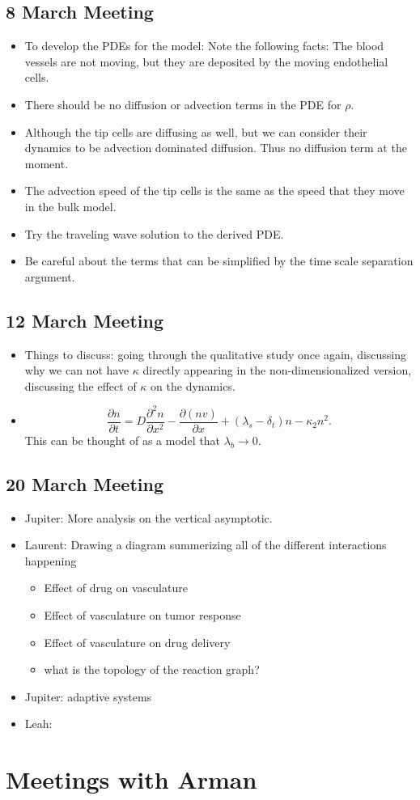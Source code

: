 \subsection{8 March Meeting}
\begin{itemize}
	\item To develop the PDEs for the model: Note the following facts: The blood vessels are not moving, but they are deposited by the moving endothelial cells.
	\item There should be no diffusion or advection terms in the PDE for $ \rho $.
	\item Although the tip cells are diffusing as well, but we can consider their dynamics to be advection dominated diffusion. Thus no diffusion term at the moment.
	\item The advection speed of the tip cells is the same as the speed that they move in the bulk model.
	\item Try the traveling wave solution to the derived PDE.
	\item Be careful about the terms that can be simplified by the time scale separation argument. 
\end{itemize}

\subsection{12 March Meeting}
\begin{itemize}
	\item Things to discuss: going through the qualitative study once again, discussing why we can not have $ \kappa $ directly appearing in the non-dimensionalized version, discussing the effect of $ \kappa $ on the dynamics.
	
	\item 
	\[ \frac{\partial n}{\partial t} = D \frac{\partial^2 n}{\partial x^2} - \frac{\partial(nv)}{\partial x} + (\lambda_s - \delta_t)n - \kappa_2 n^2. \]
	This can be thought of as a model that $ \lambda_b \to 0 $.
\end{itemize}

\subsection{20 March Meeting}
\begin{itemize}
	\item Jupiter: More analysis on the vertical asymptotic.
	\item Laurent: Drawing a diagram summerizing all of the different interactions happening
	\begin{itemize}
		\item Effect of drug on vasculature
		\item Effect of vasculature on tumor response
		\item Effect of vasculature on drug delivery
		\item what is the topology of the reaction graph?
	\end{itemize}
	\item Jupiter: adaptive systems
	\item Leah:
\end{itemize}

\section{Meetings with Arman}